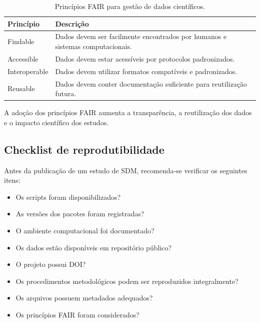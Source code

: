 \documentclass{ueap-sdm}
\begin{document}
\begin{table}[H]
	\centering
	\caption{Princípios FAIR para gestão de dados científicos.}
	\label{tab:fair_principles}
	
	\begin{tabular}{
			p{}
			p{}
		}
		
		\toprule
		
		\textbf{Princípio} &
		\textbf{Descrição}
		
		\\
		\midrule
		
		Findable &
		Dados devem ser facilmente encontrados por humanos e sistemas computacionais.
		
		\\
		
		Accessible &
		Dados devem estar acessíveis por protocolos padronizados.
		
		\\
		
		Interoperable &
		Dados devem utilizar formatos compatíveis e padronizados.
		
		\\
		
		Reusable &
		Dados devem conter documentação suficiente para reutilização futura.
		
		\\
		
		\bottomrule
		
	\end{tabular}
	
\end{table}

A adoção dos princípios FAIR aumenta a transparência, a reutilização dos dados
e o impacto científico dos estudos.

\subsection{Checklist de reprodutibilidade}

Antes da publicação de um estudo de SDM, recomenda-se verificar os seguintes
itens:

\begin{itemize}
	\item Os scripts foram disponibilizados?
	\item As versões dos pacotes foram registradas?
	\item O ambiente computacional foi documentado?
	\item Os dados estão disponíveis em repositório público?
	\item O projeto possui DOI?
	\item Os procedimentos metodológicos podem ser reproduzidos integralmente?
	\item Os arquivos possuem metadados adequados?
	\item Os princípios FAIR foram considerados?
\end{itemize}
\end{document}
